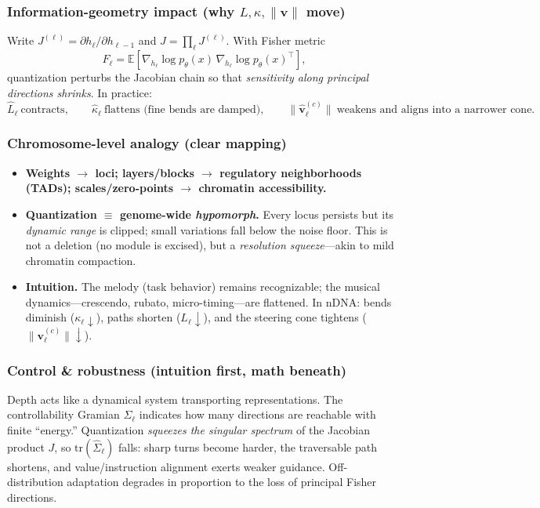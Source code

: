 \subsubsection*{Information-geometry impact (why $L,\kappa,\|\mathbf v\|$ move)}
Write $J^{(\ell)}=\partial h_\ell/\partial h_{\ell-1}$ and $J=\prod_{\ell} J^{(\ell)}$. With Fisher metric
\[
F_\ell=\mathbb{E}\!\left[\nabla_{h_\ell}\log p_\theta(x)\,\nabla_{h_\ell}\log p_\theta(x)^\top\right],
\]
quantization perturbs the Jacobian chain so that \emph{sensitivity along principal directions shrinks}. In practice:
\[
\widehat L_\ell \ \text{contracts}, \qquad \widehat\kappa_\ell \ \text{flattens (fine bends are damped)}, \qquad 
\|\widehat{\mathbf v}^{(c)}_\ell\|\ \text{weakens and aligns into a narrower cone}.
\]

\subsubsection*{Chromosome-level analogy (clear mapping)}
\begin{itemize}[leftmargin=1.2em]
  \item \textbf{Weights $\to$ loci; layers/blocks $\to$ regulatory neighborhoods (TADs); scales/zero-points $\to$ chromatin accessibility.}
  \item \textbf{Quantization $\equiv$ genome-wide \emph{hypomorph}.} Every locus persists but its \emph{dynamic range} is clipped; small variations fall below the noise floor. This is not a deletion (no module is excised), but a \emph{resolution squeeze}—akin to mild chromatin compaction.
  \item \textbf{Intuition.} The melody (task behavior) remains recognizable; the musical dynamics—crescendo, rubato, micro-timing—are flattened. In nDNA: bends diminish ($\kappa_\ell\downarrow$), paths shorten ($L_\ell\downarrow$), and the steering cone tightens ($\|\mathbf v^{(c)}_\ell\|\downarrow$).
\end{itemize}

\subsubsection*{Control \& robustness (intuition first, math beneath)}
Depth acts like a dynamical system transporting representations. The controllability Gramian $\Sigma_\ell$ indicates how many directions are reachable with finite “energy.” Quantization \emph{squeezes the singular spectrum} of the Jacobian product $J$, so $\mathrm{tr}(\widehat\Sigma_\ell)$ falls: sharp turns become harder, the traversable path shortens, and value/instruction alignment exerts weaker guidance. Off-distribution adaptation degrades in proportion to the loss of principal Fisher directions.

